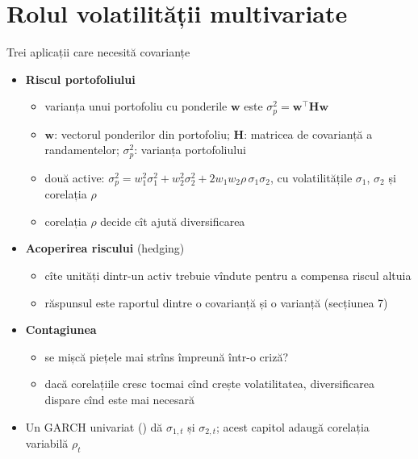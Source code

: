 \section{Rolul volatilității multivariate}

\begin{frame}{Trei aplicații care necesită covarianțe}
\itemsize{\footnotesize}
\begin{itemize}
    \item \textbf{Riscul portofoliului}
    \begin{itemize}
        \item varianța unui portofoliu cu ponderile $\mathbf{w}$ este $\sigma_p^2 = \mathbf{w}^\top\mathbf{H}\mathbf{w}$ 
        \item $\mathbf{w}$: vectorul ponderilor din portofoliu; $\mathbf{H}$: matricea de covarianță a randamentelor; $\sigma_p^2$: varianța portofoliului
        \item două active: $\sigma_p^2 = w_1^2\sigma_1^2 + w_2^2\sigma_2^2 + 2w_1w_2\rho\,\sigma_1\sigma_2$, cu volatilitățile $\sigma_1$, $\sigma_2$ și corelația $\rho$
        \item corelația $\rho$ decide cît ajută diversificarea
    \end{itemize}
    \item \textbf{Acoperirea riscului} (hedging)
    \begin{itemize}
        \item cîte unități dintr-un activ trebuie vîndute pentru a compensa riscul altuia
        \item răspunsul este raportul dintre o covarianță și o varianță (secțiunea 7)
    \end{itemize}
    \item \textbf{Contagiunea}
    \begin{itemize}
        \item se mișcă piețele mai strîns împreună într-o criză?
        \item dacă corelațiile cresc tocmai cînd crește volatilitatea, diversificarea dispare cînd este mai necesară 
    \end{itemize}
    \item Un GARCH univariat () dă $\sigma_{1,t}$ și $\sigma_{2,t}$; acest capitol adaugă corelația variabilă $\rho_t$
\end{itemize}
\end{frame}

